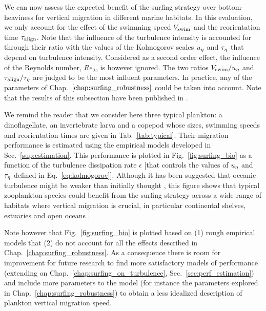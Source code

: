 We can now assess the expected benefit of the surfing strategy over bottom-heaviness for vertical migration in different marine habitats.
In this evaluation, we only account for the effect of the swimming speed $V_{\mathrm{swim}}$ and the reorientation time $\tau_{\mathrm{align}}$.
Note that the influence of the turbulence intensity is accounted for through their ratio with the values of the Kolmogorov scales $u_{\eta}$ and $\tau_{\eta}$ that depend on turbulence intensity.
Considered as a second order effect, the influence of the Reynolds number, $\mathit{Re}_{\lambda}$, is however ignored. 
The two ratios $V_{\mathrm{swim}}/u_{\eta}$ and $\tau_{\mathrm{align}}/\tau_{\eta}$ are judged to be the most influent parameters.
In practice, any of the parameters of Chap.~$\ref{chap:surfing_robustness}$ could be taken into account.
Note that the results of this subsection have been published in \citet{monthiller2022surfing}.

We remind the reader that we consider here three typical plankton: a dinoflagellate, an invertebrate larva and a copepod whose sizes, swimming speeds and reorientation times are given in Tab.~\ref{tab:typical}.
Their migration performance is estimated using the empirical models developed in Sec.~\ref{sup:estimation}.
This performance is plotted in Fig.~\ref{fig:surfing_bio} as a function of the turbulence dissipation rate $\epsilon$ [that controls the values of $u_{\eta}$ and $\tau_{\eta}$ defined in Eq.~\eqref{eq:kolmogorov}].
Although it has been suggested that oceanic turbulence might be weaker than initially thought \citep{franks2022oceanic}, this figure shows that typical zooplankton species could benefit from the surfing strategy across a wide range of habitats where vertical migration is crucial, in particular continental shelves, estuaries and open oceans \citep{fuchs2016seascape}.

Note however that Fig.~\ref{fig:surfing_bio} is plotted based on (1) rough empirical models that (2) do not account for all the effects described in Chap.~\ref{chap:surfing_robustness}.
As a consequence there is room for improvement for future research to find more satisfactory models of performance (extending on Chap.~\ref{chap:surfing_on_turbulence}, Sec.~\ref{sec:perf_estimation}) and include more parameters to the model (for instance the parameters explored in Chap.~\ref{chap:surfing_robustness}) to obtain a less idealized description of plankton vertical migration speed.




